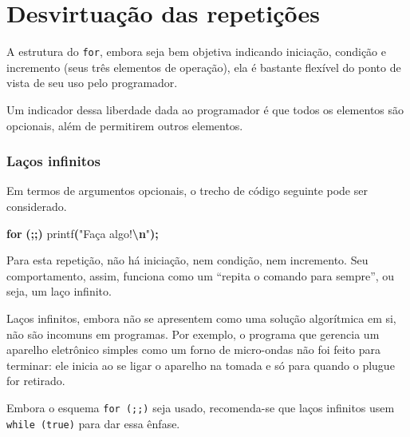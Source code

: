 \documentclass[
  11pt,
  a4paper,
]{scrbook}
\newenvironment{Shaded}{\begin{snugshade}}{\end{snugshade}}
\newcommand{\ControlFlowTok}[1]{\textcolor[rgb]{0.13,0.29,0.53}{\textbf{#1}}}
\newcommand{\NormalTok}[1]{#1}
\newcommand{\OperatorTok}[1]{\textcolor[rgb]{0.81,0.36,0.00}{\textbf{#1}}}
\newcommand{\SpecialCharTok}[1]{\textcolor[rgb]{0.81,0.36,0.00}{\textbf{#1}}}
\newcommand{\StringTok}[1]{\textcolor[rgb]{0.31,0.60,0.02}{#1}}
\begin{document}
\chapter{Desvirtuação das
repetições}\label{sec-desvirtuacao-das-repeticoes}

A estrutura do \texttt{for}, embora seja bem objetiva indicando
iniciação, condição e incremento (seus três elementos de operação), ela
é bastante flexível do ponto de vista de seu uso pelo programador.

Um indicador dessa liberdade dada ao programador é que todos os
elementos são opcionais, além de permitirem outros elementos.

\subsection{Laços infinitos}\label{lauxe7os-infinitos}

Em termos de argumentos opcionais, o trecho de código seguinte pode ser
considerado.

\begin{Shaded}
\begin{Highlighting}[]
\ControlFlowTok{for} \OperatorTok{(;;)}
\NormalTok{    printf}\OperatorTok{(}\StringTok{"Faça algo!}\SpecialCharTok{\textbackslash{}n}\StringTok{"}\OperatorTok{);}
\end{Highlighting}
\end{Shaded}

Para esta repetição, não há iniciação, nem condição, nem incremento. Seu
comportamento, assim, funciona como um ``repita o comando para sempre'',
ou seja, um laço infinito.

\begin{tcolorbox}[enhanced jigsaw, arc=.35mm, bottomtitle=1mm, colbacktitle=quarto-callout-tip-color!10!white, title=\textcolor{quarto-callout-tip-color}{\faLightbulb}\hspace{0.5em}{Dica}, toprule=.15mm, left=2mm, opacityback=0, colback=white, colframe=quarto-callout-tip-color-frame, opacitybacktitle=0.6, bottomrule=.15mm, leftrule=.75mm, toptitle=1mm, coltitle=black, titlerule=0mm, rightrule=.15mm, breakable]

Laços infinitos, embora não se apresentem como uma solução algorítmica
em si, não são incomuns em programas. Por exemplo, o programa que
gerencia um aparelho eletrônico simples como um forno de micro-ondas não
foi feito para terminar: ele inicia ao se ligar o aparelho na tomada e
só para quando o plugue for retirado.

Embora o esquema \texttt{for\ (;;)} seja usado, recomenda-se que laços
infinitos usem \texttt{while\ (true)} para dar essa ênfase.

\end{tcolorbox}
\end{document}

